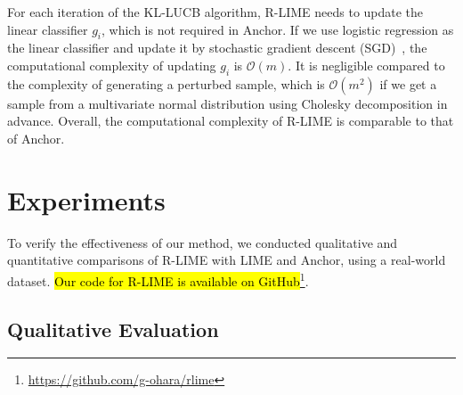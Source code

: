 \documentclass[runningheads]{llncs}
\begin{document}
{For each iteration of the KL-LUCB algorithm, R-LIME needs to update
the linear classifier $g_i$, which is not required in Anchor.
If we use logistic regression as the linear classifier and update it
by stochastic gradient descent (SGD)~\cite{robbins1951stochastic},
the computational complexity of updating $g_i$ is $\mathcal{O}(m)$.
It is negligible compared to the complexity of generating a perturbed sample,
which is $\mathcal{O}(m^2)$ if we get a sample
from a multivariate normal distribution using Cholesky decomposition in advance.
Overall, the computational complexity of R-LIME is comparable to that of Anchor.

\section{Experiments}
To verify the effectiveness of our method,
we conducted qualitative and quantitative comparisons of R-LIME
with LIME and Anchor, using a real-world dataset.
\hl{Our code for R-LIME is available on GitHub}\footnote{\url{https://github.com/g-ohara/rlime}}.

\newpage
\subsection{Qualitative Evaluation}\label{sec:exp-qual}
}
\end{document}
